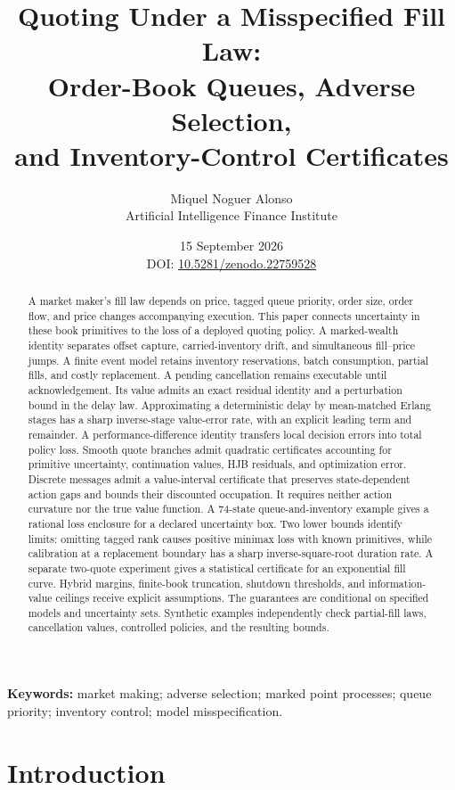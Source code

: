 \documentclass[11pt]{article}
\title{Quoting Under a Misspecified Fill Law:\\
Order-Book Queues, Adverse Selection,\\
and Inventory-Control Certificates}
\author{Miquel Noguer Alonso\\
\small Artificial Intelligence Finance Institute}
\date{15 September 2026\\[5pt]\small DOI:
\href{https://doi.org/10.5281/zenodo.22759528}{10.5281/zenodo.22759528}}
\theoremstyle{plain}
\theoremstyle{definition}
\theoremstyle{remark}
\begin{document}
\maketitle
\begin{abstract}
A market maker's fill law depends on price, tagged queue priority,
order size, order flow, and price changes accompanying execution.
This paper connects uncertainty in these book primitives to the
loss of a deployed quoting policy. A marked-wealth identity separates
offset capture, carried-inventory drift, and simultaneous fill--price
jumps. A finite event model retains inventory reservations, batch
consumption, partial fills, and costly replacement. A pending
cancellation remains executable until acknowledgement. Its value
admits an exact residual identity and a perturbation bound in the
delay law. Approximating a deterministic delay by mean-matched
Erlang stages has a sharp inverse-stage value-error rate, with an
explicit leading term and remainder.
A performance-difference identity transfers local decision errors
into total policy loss. Smooth quote branches admit quadratic
certificates accounting for primitive uncertainty, continuation
values, HJB residuals, and optimization error. Discrete messages
admit a value-interval certificate that preserves state-dependent
action gaps and bounds their discounted occupation. It requires
neither action curvature nor the true value function. A 74-state
queue-and-inventory example gives a rational loss enclosure for
a declared uncertainty box. Two lower bounds identify limits:
omitting tagged rank causes positive minimax loss with known
primitives, while calibration at a replacement boundary has a sharp
inverse-square-root duration rate. A separate two-quote experiment
gives a statistical certificate for an exponential fill curve.
Hybrid margins, finite-book truncation, shutdown thresholds,
and information-value ceilings receive explicit assumptions.
The guarantees are conditional on specified models and uncertainty
sets. Synthetic examples independently check partial-fill laws,
cancellation values, controlled policies, and the resulting bounds.
\end{abstract}
\noindent\textbf{Keywords:} market making; adverse selection; marked point
processes; queue priority; inventory control; model misspecification.

\clearpage
\tableofcontents
\clearpage

\section{Introduction}
\end{document}
